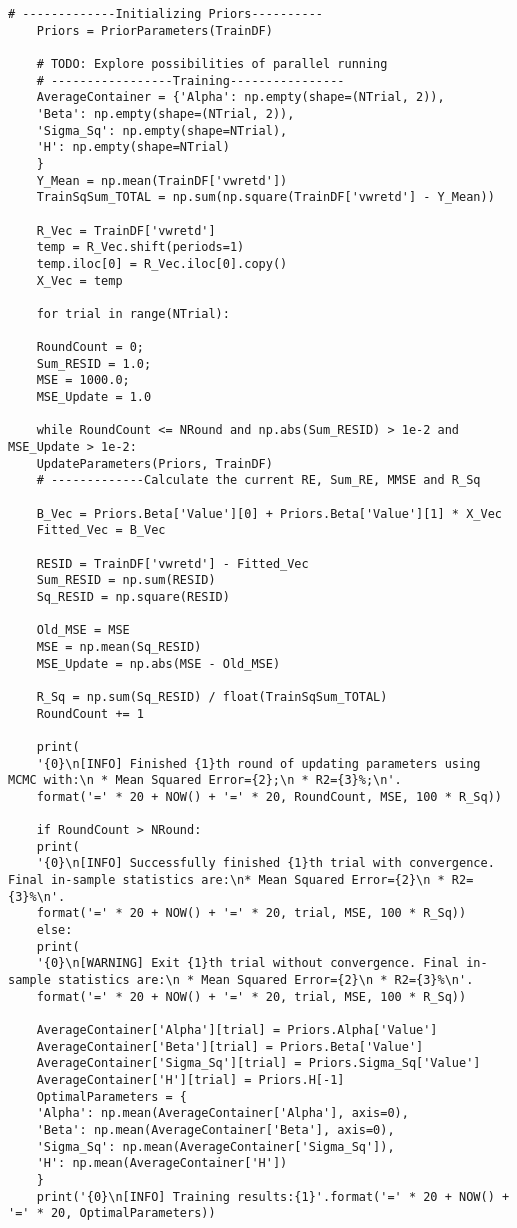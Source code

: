 \documentclass[letterpaper]{article}
\begin{document}
\begin{lstlisting}[label=lst:pythoncode]
	# -------------Initializing Priors----------
	Priors = PriorParameters(TrainDF)
	
	# TODO: Explore possibilities of parallel running
	# -----------------Training----------------
	AverageContainer = {'Alpha': np.empty(shape=(NTrial, 2)),
	'Beta': np.empty(shape=(NTrial, 2)),
	'Sigma_Sq': np.empty(shape=NTrial),
	'H': np.empty(shape=NTrial)
	}
	Y_Mean = np.mean(TrainDF['vwretd'])
	TrainSqSum_TOTAL = np.sum(np.square(TrainDF['vwretd'] - Y_Mean))
	
	R_Vec = TrainDF['vwretd']
	temp = R_Vec.shift(periods=1)
	temp.iloc[0] = R_Vec.iloc[0].copy()
	X_Vec = temp
	
	for trial in range(NTrial):
	
	RoundCount = 0;
	Sum_RESID = 1.0;
	MSE = 1000.0;
	MSE_Update = 1.0
	
	while RoundCount <= NRound and np.abs(Sum_RESID) > 1e-2 and MSE_Update > 1e-2:
	UpdateParameters(Priors, TrainDF)
	# -------------Calculate the current RE, Sum_RE, MMSE and R_Sq
	
	B_Vec = Priors.Beta['Value'][0] + Priors.Beta['Value'][1] * X_Vec
	Fitted_Vec = B_Vec
	
	RESID = TrainDF['vwretd'] - Fitted_Vec
	Sum_RESID = np.sum(RESID)
	Sq_RESID = np.square(RESID)
	
	Old_MSE = MSE
	MSE = np.mean(Sq_RESID)
	MSE_Update = np.abs(MSE - Old_MSE)
	
	R_Sq = np.sum(Sq_RESID) / float(TrainSqSum_TOTAL)
	RoundCount += 1
	
	print(
	'{0}\n[INFO] Finished {1}th round of updating parameters using MCMC with:\n * Mean Squared Error={2};\n * R2={3}%;\n'.
	format('=' * 20 + NOW() + '=' * 20, RoundCount, MSE, 100 * R_Sq))
	
	if RoundCount > NRound:
	print(
	'{0}\n[INFO] Successfully finished {1}th trial with convergence. Final in-sample statistics are:\n* Mean Squared Error={2}\n * R2={3}%\n'.
	format('=' * 20 + NOW() + '=' * 20, trial, MSE, 100 * R_Sq))
	else:
	print(
	'{0}\n[WARNING] Exit {1}th trial without convergence. Final in-sample statistics are:\n * Mean Squared Error={2}\n * R2={3}%\n'.
	format('=' * 20 + NOW() + '=' * 20, trial, MSE, 100 * R_Sq))
	
	AverageContainer['Alpha'][trial] = Priors.Alpha['Value']
	AverageContainer['Beta'][trial] = Priors.Beta['Value']
	AverageContainer['Sigma_Sq'][trial] = Priors.Sigma_Sq['Value']
	AverageContainer['H'][trial] = Priors.H[-1]
	OptimalParameters = {
	'Alpha': np.mean(AverageContainer['Alpha'], axis=0),
	'Beta': np.mean(AverageContainer['Beta'], axis=0),
	'Sigma_Sq': np.mean(AverageContainer['Sigma_Sq']),
	'H': np.mean(AverageContainer['H'])
	}
	print('{0}\n[INFO] Training results:{1}'.format('=' * 20 + NOW() + '=' * 20, OptimalParameters))
	

\end{lstlisting}
\end{document}
